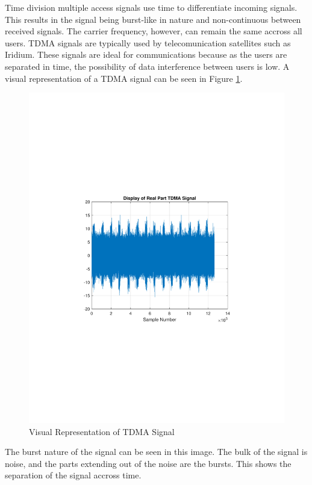 \documentclass[12pt]{report}
\begin{document}
Time division multiple access signals use time to differentiate incoming signals. This results in the signal being burst-like in nature and non-continuous between received signals. The carrier frequency, however, can remain the same accross all users. TDMA signals are typically used by telecomunication satellites such as Iridium. These signals are ideal for communications because as the users are separated in time, the possibility of data interference between users is low. A visual representation of a TDMA signal can be seen in Figure \ref{fig:TDMAVisual}.

\begin{figure}[h!]
    \centering
    \includegraphics[width=5in]{TDMA_signal}
    \caption{Visual Representation of TDMA Signal}
    \label{fig:TDMAVisual}
\end{figure}

The burst nature of the signal can be seen in this image. The bulk of the signal is noise, and the parts extending out of the noise are the bursts. This shows the separation of the signal accross time. 
\end{document}

